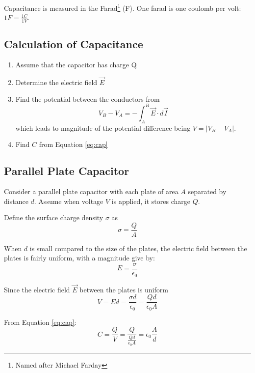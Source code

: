 \documentclass[14pt]{memoir}
\begin{document}
Capacitance is measured in the Farad\footnote{Named after Michael Farday} (F). One farad is one coulomb per volt: $1 F = \frac{1 C}{1 V}$. 

\subsection{Calculation of Capacitance}
\begin{enumerate}
\item Assume that the capacitor has charge Q
\item Determine the electric field $\vec{E}$
\item Find the potential between the conductors from
	\begin{equation}
	V_B - V_A = - \int_A^B \vec{E} \cdot d\vec{I}
	\label{eq:potcon}
	\end{equation}
	which leads to magnitude of the potential difference being $V = \left| V_B - V_A \right|$.
\item Find $C$ from Equation \ref{eq:cap}
\end{enumerate}

\subsection{Parallel Plate Capacitor}
Consider a parallel plate capacitor with each plate of area $A$ separated by distance $d$. Assume when voltage $V$ is applied, it stores charge $Q$. 

Define the surface charge density $\sigma$ as
\begin{equation}
\sigma = \frac{Q}{A}
\end{equation}

When $d$ is small compared to the size of the plates, the electric field between the plates is fairly uniform, with a magnitude give by:
\begin{equation}
E = \frac{\sigma}{\epsilon_0}
\end{equation}

Since the electric field $\vec{E}$ between the plates is uniform
\begin{equation}
V = Ed = \frac{\sigma d}{\epsilon_0} = \frac{Q d}{\epsilon_0 A}
\end{equation}

From Equation \ref{eq:cap}:
\begin{equation}
C = \frac{Q}{V} = \frac{Q}{\frac{Q d}{\epsilon_0 A}} = \epsilon_0 \frac{A}{d}
\label{eq:qv}
\end{equation}
\end{document}
